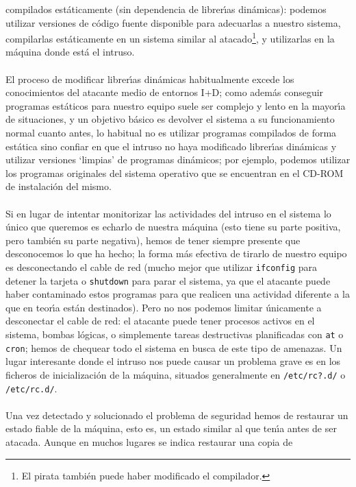 compilados est\'aticamente (sin dependencia de librer\'{\i}as din\'amicas): 
podemos utilizar versiones de c\'odigo fuente disponible para adecuarlas a 
nuestro sistema, compilarlas est\'aticamente en un sistema similar al atacado\footnote{El pirata tambi\'en puede haber modificado el compilador.},
y utilizarlas en la m\'aquina donde est\'a el intruso.\\
\\El proceso de modificar librer\'{\i}as din\'amicas habitualmente excede los 
conocimientos del atacante medio de entornos I+D; como adem\'as conseguir
programas est\'aticos para nuestro equipo suele
ser complejo y lento en la mayor\'{\i}a de situaciones, y un objetivo b\'asico
es devolver el sistema a su funcionamiento normal cuanto antes, lo habitual no
es utilizar programas compilados de forma est\'atica sino confiar en que el
intruso no haya modificado librer\'{\i}as din\'amicas y utilizar versiones
`limpias' de programas din\'amicos; por ejemplo, podemos utilizar los programas
originales del sistema operativo que se encuentran en el CD-ROM de instalaci\'on
del mismo.\\
\\Si en lugar de intentar monitorizar las actividades del intruso en el sistema
lo \'unico que queremos es echarlo de nuestra m\'aquina (esto tiene su parte
positiva, pero tambi\'en su parte negativa), hemos de tener siempre presente
que desconocemos lo que ha hecho; la forma m\'as efectiva de tirarlo de nuestro
equipo es desconectando el cable de red (mucho mejor que utilizar {\tt ifconfig}
para detener la tarjeta o {\tt shutdown} para parar el sistema, ya que el
atacante puede haber contaminado estos programas para que realicen una actividad
diferente a la que en teor\'{\i}a est\'an destinados). Pero no nos podemos 
limitar \'unicamente a desconectar el cable de red: el atacante puede tener
procesos activos en el sistema, bombas l\'ogicas, o simplemente tareas 
destructivas planificadas con {\tt at} o {\tt cron}; hemos de chequear todo
el sistema en busca de este tipo de amenazas. Un lugar interesante donde
el intruso nos puede causar un problema grave es en los ficheros de 
inicializaci\'on de la m\'aquina, situados generalmente en {\tt /etc/rc?.d/}
o {\tt /etc/rc.d/}.\\ 
\\Una vez detectado y solucionado el problema de seguridad hemos de restaurar
un estado fiable de la m\'aquina, esto es, un estado similar al que ten\'{\i}a
antes de ser atacada. Aunque en muchos lugares se indica restaurar una copia de
